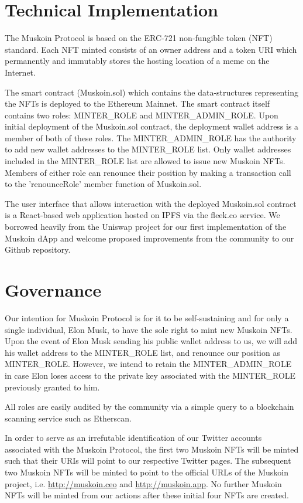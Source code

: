 \documentclass{article}
\begin{document}
\section{Technical Implementation}
The Muskoin Protocol is based on the ERC-721 non-fungible token (NFT) standard. Each NFT minted consists of an owner address and a token URI which permanently and immutably stores the hosting location of a meme on the Internet. 

The smart contract (Muskoin.sol) which contains the data-structures representing the NFTs is deployed to the Ethereum Mainnet. The smart contract itself contains two roles: MINTER\_ROLE and MINTER\_ADMIN\_ROLE. Upon initial deployment of the Muskoin.sol contract, the deployment wallet address is a member of both of these roles. The MINTER\_ADMIN\_ROLE has the authority to add new wallet addresses to the MINTER\_ROLE list. Only wallet addresses included in the MINTER\_ROLE list are allowed to issue new Muskoin NFTs. Members of either role can renounce their position by making a transaction call to the 'renounceRole' member function of Muskoin.sol. 

The user interface that allows interaction with the deployed Muskoin.sol contract is a React-based web application hosted on IPFS via the fleek.co service. We borrowed heavily from the Uniswap project for our first implementation of the Muskoin dApp and welcome proposed improvements from the community to our Github repository. 

\section{Governance}

Our intention for Muskoin Protocol is for it to be self-sustaining and for only a single individual, Elon Musk, to have the sole right to mint new Muskoin NFTs. Upon the event of Elon Musk sending his public wallet address to us, we will add his wallet address to the MINTER\_ROLE list, and renounce our position as MINTER\_ROLE. However, we intend to retain the MINTER\_ADMIN\_ROLE in case Elon loses access to the private key associated with the MINTER\_ROLE previously granted to him. 

All roles are easily audited by the community via a simple query to a blockchain scanning service such as Etherscan.

In order to serve as an irrefutable identification of our Twitter accounts associated with the Muskoin Protocol, the first two Muskoin NFTs will be minted such that their URIs will point to our respective Twitter pages. The subsequent two Muskoin NFTs will be minted to point to the official URLs of the Muskoin project, i.e. \href{http://muskoin.ceo}{http://muskoin.ceo} and \href{http://muskoin.app}{http://muskoin.app}. No further Muskoin NFTs will be minted from our actions after these initial four NFTs are created. 
\end{document}
